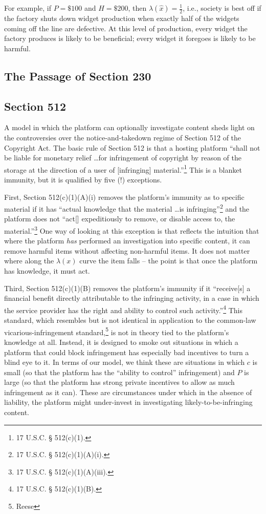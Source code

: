 For example, if $P = \$100$ and $H = \$200$, then $\lambda(\hat{x}) = \frac{1}{2}$, i.e., society is best off if the factory shuts down widget production when exactly half of the widgets coming off the line are defective. At this level of production, every widget the factory produces is likely to be beneficial; every widget it foregoes is likely to be harmful.



\subsection{The Passage of Section 230}





\subsection{Section 512}

A model in which the platform can optionally investigate content sheds light on the controversies over the notice-and-takedown regime of Section 512 of the Copyright Act. The basic rule of Section 512 is that a hosting platform ``shall not be liable for monetary relief \ldots for infringement of copyright by reason of the storage at the direction of a user of [infringing] material.''\footnote{17 U.S.C. § 512(c)(1).} This is a blanket immunity, but it is qualified by five (!) exceptions.

First, Section 512(c)(1)(A)(i) removes the platform's immunity as to specific material if it has ``actual knowledge that the material \ldots is infringing''\footnote{17 U.S.C. § 512(c)(1)(A)(i).} and the platform does not ``act[] expeditiously to remove, or disable access to, the material.''\footnote{17 U.S.C. § 512(c)(1)(A)(iii).} One way of looking at this exception is that reflects the intuition that where the platform \emph{has} performed an investigation into specific content, it can remove harmful items without affecting non-harmful items. It does not matter where along the $\lambda(x)$ curve the item falls -- the point is that once the platform has knowledge, it must act. 



Third, Section 512(c)(1)(B) removes the platform's immunity if it ``receive[s] a financial benefit directly attributable to the infringing activity, in a case in which the service provider has the right and ability to control such activity.''\footnote{17 U.S.C. § 512(c)(1)(B).} This standard, which resembles but is not identical in application to the common-law vicarious-infringement standard,\footnote{Reese} is not in theory tied to the platform's knowledge at all. Instead, it is designed to smoke out situations in which a platform that could block infringement has especially bad incentives to turn a blind eye to it. In terms of our model, we think these are situations in which $c$ is small (so that the platform has the ``ability to control'' infringement) and $P$ is large (so that the platform has strong private incentives to allow as much infringement as it can). These are circumstances under which in the absence of liability, the platform might under-invest in investigating likely-to-be-infringing content.

